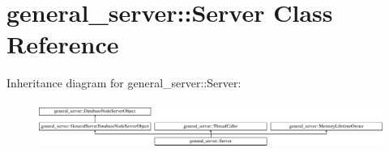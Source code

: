 \hypertarget{classgeneral__server_1_1Server}{\section{general\-\_\-server\-:\-:\-Server \-Class \-Reference}
\label{classgeneral__server_1_1Server}
}
\-Inheritance diagram for general\-\_\-server\-:\-:\-Server\-:\begin{figure}[H]
\begin{center}
\leavevmode
\includegraphics[height=1.573034cm]{classgeneral__server_1_1Server}
\end{center}
\end{figure}
